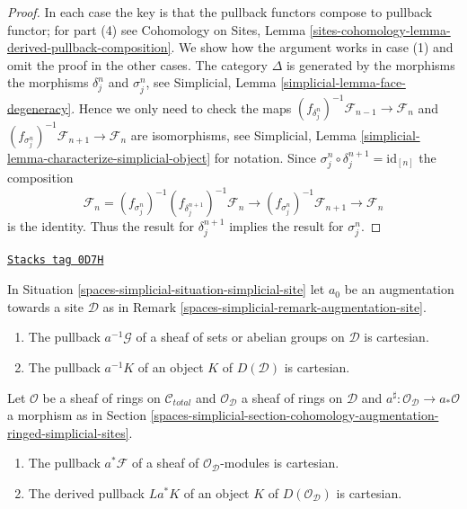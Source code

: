 \begin{proof}
In each case the key is that the pullback functors
compose to pullback functor; for part (4) see
Cohomology on Sites, Lemma
\ref{sites-cohomology-lemma-derived-pullback-composition}.
We show how the argument works in case (1) and omit the proof
in the other cases.
The category $\Delta$ is generated by the morphisms
the morphisms $\delta^n_j$ and $\sigma^n_j$, see
Simplicial, Lemma \ref{simplicial-lemma-face-degeneracy}.
Hence we only need to check the maps
$(f_{\delta^n_j})^{-1}\mathcal{F}_{n - 1} \to \mathcal{F}_n$
and $(f_{\sigma^n_j})^{-1}\mathcal{F}_{n + 1} \to \mathcal{F}_n$ are
isomorphisms, see
Simplicial, Lemma \ref{simplicial-lemma-characterize-simplicial-object}
for notation. Since $\sigma^n_j \circ \delta_j^{n + 1} = \text{id}_{[n]}$
the composition
$$
\mathcal{F}_n =
(f_{\sigma^n_j})^{-1}
(f_{\delta_j^{n + 1}})^{-1}
\mathcal{F}_n \to
(f_{\sigma^n_j})^{-1}
\mathcal{F}_{n + 1} \to
\mathcal{F}_n
$$
is the identity. Thus the result for $\delta^{n + 1}_j$ implies the result
for $\sigma^n_j$.
\end{proof}

\begin{lemma}
\label{spaces-simplicial-lemma-augmentation-cartesian-module}
\href{https://stacks.math.columbia.edu/tag/0D7H}{\texttt{Stacks tag 0D7H}}

In Situation \ref{spaces-simplicial-situation-simplicial-site} let
$a_0$ be an augmentation towards a site $\mathcal{D}$ as in
Remark \ref{spaces-simplicial-remark-augmentation-site}.
\begin{enumerate}
\item The pullback $a^{-1}\mathcal{G}$ of a sheaf of sets or abelian groups
on $\mathcal{D}$ is cartesian.
\item The pullback $a^{-1}K$ of an object $K$ of $D(\mathcal{D})$
is cartesian.
\end{enumerate}
Let $\mathcal{O}$ be a sheaf of rings on $\mathcal{C}_{total}$ and
$\mathcal{O}_\mathcal{D}$ a sheaf of rings on $\mathcal{D}$
and $a^\sharp : \mathcal{O}_\mathcal{D} \to a_*\mathcal{O}$ a
morphism as in
Section \ref{spaces-simplicial-section-cohomology-augmentation-ringed-simplicial-sites}.
\begin{enumerate}
\item[(3)] The pullback $a^*\mathcal{F}$ of a sheaf of
$\mathcal{O}_\mathcal{D}$-modules is cartesian.
\item[(4)] The derived pullback $La^*K$ of an object
$K$ of $D(\mathcal{O}_\mathcal{D})$ is cartesian.
\end{enumerate}
\end{lemma}

